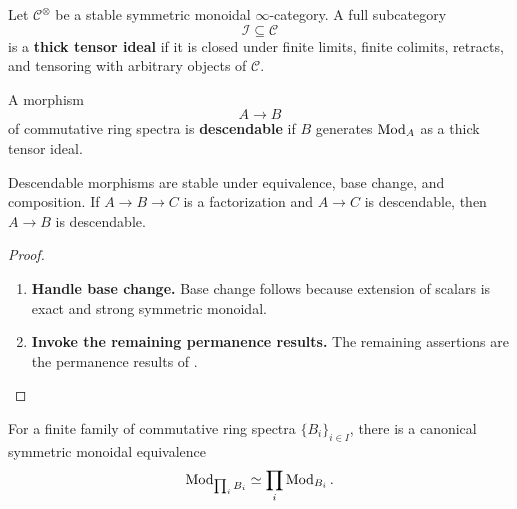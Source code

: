 \begin{definition}
\label{def:spectral-thick-tensor-ideal}
Let $\mathcal C^\otimes$ be a stable symmetric monoidal
$\infty$-category. A full subcategory
\[
    \mathcal I
    \subseteq
    \mathcal C
\]
is a \textbf{thick tensor ideal} if it is closed under finite limits,
finite colimits, retracts, and tensoring with arbitrary objects of
$\mathcal C$.
\end{definition}

\begin{definition}
\label{def:spectral-descendable-morphism}
A morphism
\[
    A
    \longrightarrow
    B
\]
of commutative ring spectra is \textbf{descendable} if $B$ generates
$\operatorname{Mod}_A$ as a thick tensor ideal.
\end{definition}

\begin{proposition}
\label{prop:spectral-descendability-permanence}
Descendable morphisms are stable under equivalence, base change, and
composition. If $A\to B\to C$ is a factorization and $A\to C$ is
descendable, then $A\to B$ is descendable.
\end{proposition}

\begin{proof}
\leavevmode
\begin{enumerate}[label=\textup{(\arabic*)}]
    \item \textbf{Handle base change.}
    Base change follows because extension of scalars is exact and strong
    symmetric monoidal.

    \item \textbf{Invoke the remaining permanence results.}
    The remaining assertions are the permanence results of
    \cite[Proposition~3.24]{MathewGaloisStableHomotopy}.
\end{enumerate}
\end{proof}

\begin{lemma}
\label{lem:spectral-modules-finite-products}
For a finite family of commutative ring spectra $\{B_i\}_{i\in I}$, there
is a canonical symmetric monoidal equivalence
\[
    \operatorname{Mod}_{\prod_iB_i}
    \simeq
    \prod_i\operatorname{Mod}_{B_i}.
\]
\end{lemma}

